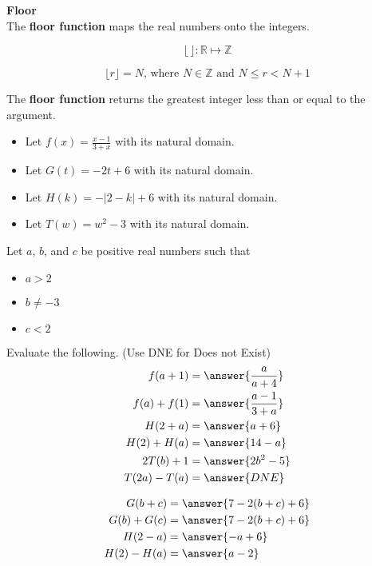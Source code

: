 \documentclass{ximera}
\author{Alan Yang}
\begin{document}
\begin{defintion}  \textbf{\textcolor{green!50!black}{Floor}} \\

The \textbf{floor function} maps the real numbers onto the integers.

\[
\lfloor \, \rfloor : \mathbb{R} \mapsto \mathbb{Z}
\]


\[
\lfloor r \rfloor = N \text{, where } N \in \mathbb{Z} \text{ and } N \leq r < N+1  
\]


The \textbf{floor function} returns the greatest integer less than or equal to the argument.

\end{defintion}






\begin{exercise}



\begin{itemize}
\item Let $f(x) = \frac{x-1}{3 + x}$ with its natural domain. \\
\item Let $G(t) = -2t + 6$ with its natural domain. \\
\item Let $H(k) =  -|2-k|+6$ with its natural domain. \\
\item Let $T(w) = w^2 - 3$ with its natural domain. \\
\end{itemize}

Let $a$, $b$, and $c$ be positive real numbers such that 

\begin{itemize}
\item $a > 2$ 
\item $b \ne -3$
\item $c < 2$
\end{itemize}


Evaluate the following.  (Use DNE for Does not Exist) \\






\begin{align*}
f(a + 1)   &=  \answer{\frac{a}{a+4}} \\
f(a) + f(1)   &=  \answer{\frac{a-1}{3+a}} \\
H(2+a)    &=  \answer{a+6} \\
H(2) + H(a)    &=  \answer{14-a} \\
2 T(b) + 1   &=  \answer{2 b^2 - 5} \\
T(2a) - T(a)  &=  \answer{DNE}
\end{align*}






\begin{align*}
G(b+c)   &=  \answer{7-2(b+c)+6} \\
G(b) + G(c)   &=  \answer{7-2(b+c)+6} \\
H(2-a)    &=  \answer{-a+6} \\
H(2) - H(a)    &=  \answer{a-2} 
\end{align*}



\end{exercise}
\end{document}
